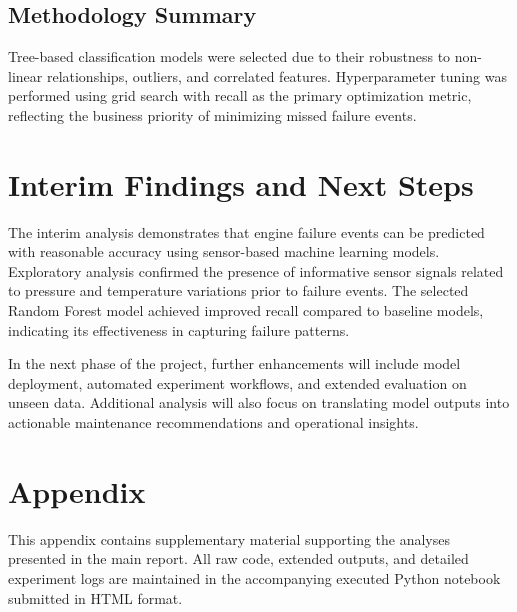 \documentclass[11pt,a4paper]{article}
\begin{document}
\subsection*{Methodology Summary}

Tree-based classification models were selected due to their robustness to non-linear relationships, outliers, and correlated features. Hyperparameter tuning was performed using grid search with recall as the primary optimization metric, reflecting the business priority of minimizing missed failure events.

\newpage

\section{Interim Findings and Next Steps}

The interim analysis demonstrates that engine failure events can be predicted with reasonable accuracy using sensor-based machine learning models. Exploratory analysis confirmed the presence of informative sensor signals related to pressure and temperature variations prior to failure events. The selected Random Forest model achieved improved recall compared to baseline models, indicating its effectiveness in capturing failure patterns.

In the next phase of the project, further enhancements will include model deployment, automated experiment workflows, and extended evaluation on unseen data. Additional analysis will also focus on translating model outputs into actionable maintenance recommendations and operational insights.



\appendix
\section{Appendix}

This appendix contains supplementary material supporting the analyses presented in the main report. All raw code, extended outputs, and detailed experiment logs are maintained in the accompanying executed Python notebook submitted in HTML format.
\end{document}
